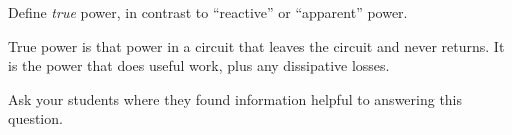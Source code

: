 

Define {\it true} power, in contrast to ``reactive'' or ``apparent'' power.







True power is that power in a circuit that leaves the circuit and never returns.  It is the power that does useful work, plus any dissipative losses.







Ask your students where they found information helpful to answering this question.




